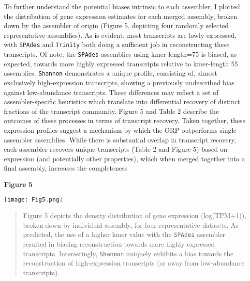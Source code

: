 \documentclass[10pt,letterpaper]{article}
\providecommand{\DIFaddbegin}{} %
\providecommand{\DIFaddend}{} %
\providecommand{\DIFdelbegin}{} %
\providecommand{\DIFdelend}{} %
\newcommand{\DIFscaledelfig}{0.5}
\newlength{\DIFdelgraphicswidth} %
\newlength{\DIFdelgraphicsheight} %
\newcommand{\DIFaddincludegraphics}[2][]{{\color{blue}\fbox{\DIFOincludegraphics[#1]{#2}}}} %
\newcommand{\DIFdelincludegraphics}[2][]{%
\sbox{\DIFdelgraphicsbox}{\DIFOincludegraphics[#1]{#2}}%
\settoboxwidth{\DIFdelgraphicswidth}{\DIFdelgraphicsbox} %
\settoboxtotalheight{\DIFdelgraphicsheight}{\DIFdelgraphicsbox} %
\scalebox{\DIFscaledelfig}{%
\parbox[b]{\DIFdelgraphicswidth}{\usebox{\DIFdelgraphicsbox}\\[-\baselineskip] \rule{\DIFdelgraphicswidth}{0em}}\llap{\resizebox{\DIFdelgraphicswidth}{\DIFdelgraphicsheight}{%
\setlength{\unitlength}{\DIFdelgraphicswidth}%
\begin{picture}(1,1)%
\thicklines\linethickness{2pt} %
{\color[rgb]{1,0,0}\put(0,0){\framebox(1,1){}}}%
{\color[rgb]{1,0,0}\put(0,0){\line( 1,1){1}}}%
{\color[rgb]{1,0,0}\put(0,1){\line(1,-1){1}}}%
\end{picture}%
}\hspace*{3pt}}} %
} %
\DeclareRobustCommand{\DIFaddbegin}{\DIFOaddbegin \let\includegraphics\DIFaddincludegraphics} %
\DeclareRobustCommand{\DIFaddend}{\DIFOaddend \let\includegraphics\DIFOincludegraphics} %
\DeclareRobustCommand{\DIFdelbegin}{\DIFOdelbegin \let\includegraphics\DIFdelincludegraphics} %
\DeclareRobustCommand{\DIFdelend}{\DIFOaddend \let\includegraphics\DIFOincludegraphics} %
\begin{document}
To further understand the potential biases intrinsic to each assembler, I plotted the distribution of gene expression estimates for each merged assembly, broken down by the assembler of origin (Figure 5, depicting four randomly selected representative assemblies). As is evident, most transcripts are lowly expressed, with \texttt{SPAdes} and \texttt{Trinity} both doing a sufficient job in reconstructing these transcripts. Of note, the \texttt{SPAdes} assemblies using kmer-length=75 is biased, as expected, towards more highly expressed transcripts relative to kmer-length 55 assemblies. \texttt{Shannon} demonstrates a unique profile, consisting of, almost exclusively high-expression transcripts, showing a previously undescribed bias against low-abundance transcripts. These differences may reflect a set of assembler-specific heuristics which translate into differential recovery of distinct fractions of the transcript community. Figure 5 and Table 2 describe the outcomes of these processes in terms of transcript recovery. Taken together, these expression profiles suggest a mechanism by which the ORP outperforms single-assembler assemblies. While there is substantial overlap in transcript recovery, each assembler recovers unique transcripts (Table 2 and Figure 5) based on expression (and potentially other properties), which when merged together into a final assembly, increases the completeness 

 

\textbf{\hypertarget{Figure 5}{Figure 5}} \\
\centerline{\texttt{[image: Fig5.png]}}
\begin{quote}
\DIFdelbegin %
\DIFdelend \DIFaddbegin \small{Figure 5 depicts the density distribution of gene expression (log(TPM+1)), broken down by individual assembly, for four representative datasets. As predicted, the use of a higher kmer value with the \texttt{SPAdes} assembler resulted in biasing reconstruction towards more highly expressed transcripts. Interestingly, \texttt{Shannon} uniquely exhibits a bias towards the reconstruction of high-expression transcripts (or away from low-abundance transcripts).}
\DIFaddend \end{quote} 
\end{document}
